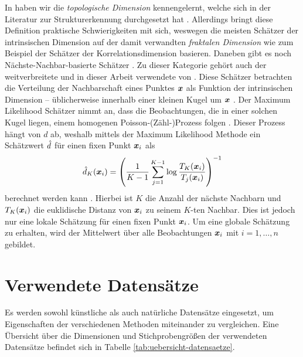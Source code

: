 In  haben wir die \textit{topologische
	Dimension} kennengelernt, welche sich in der Literatur zur Strukturerkennung durchgesetzt hat \parencite[1]{Campadelli.2015}. Allerdings bringt diese Definition praktische Schwierigkeiten mit sich,
weswegen die meisten Schätzer der intrinsischen Dimension auf der damit verwandten
\textit{fraktalen Dimension} wie zum Beispiel der Schätzer der Korrelationsdimension \parencite{Camastra.2002} basieren. Daneben gibt es noch Nächste-Nachbar-basierte Schätzer \parencite[1]{Campadelli.2015}. Zu dieser Kategorie gehört auch der weitverbreitete und in dieser
Arbeit verwendete  von \textcite{Levina.2004}. Diese Schätzer
betrachten die Verteilung der Nachbarschaft eines Punktes $\bm{x}$ als Funktion der
intrinsischen Dimension -- üblicherweise innerhalb einer kleinen Kugel um $\bm{x}$
\parencite[8]{Campadelli.2015}. Der Maximum Likelihood Schätzer nimmt an, dass die Beobachtungen, die
in einer solchen Kugel liegen, einem homogenen Poisson-(Zähl-)Prozess folgen
\parencite[2]{Levina.2004}. Dieser Prozess hängt von $d$ ab, weshalb mittels der Maximum Likelihood
Methode ein Schätzwert $\hat{d}$ für einen fixen Punkt $\bm{x}_i$ als
\begin{equation}
	\hat{d}_K(\bm{x}_i) = \left( \frac{1}{K - 1} \sum_{j=1}^{K - 1} \log \frac{T_K(\bm{x}_i)}{T_j(\bm{x}_i)} \right)^{-1}
\end{equation}
berechnet werden kann \parencite[4]{Levina.2004}. Hierbei ist $K$ die Anzahl der nächste Nachbarn und $T_{K}(\bm{x}_i)$ die
euklidische Distanz von $\bm{x}_i$ zu seinem $K$-ten Nachbar. Dies ist jedoch nur eine lokale
Schätzung für einen fixen Punkt $\bm{x}_i$. Um eine globale Schätzung zu erhalten, wird der
Mittelwert über alle Beobachtungen $\bm{x}_i$ mit $i = 1, \ldots, n$ gebildet.
\section{Verwendete Datensätze}
\label{ch:Vergleich:sec:VerwendeteDatensaetze}
Es werden sowohl künstliche als auch natürliche Datensätze eingesetzt, um Eigenschaften der
verschiedenen Methoden miteinander zu vergleichen. Eine Übersicht über die Dimensionen und Stichprobengrößen der verwendeten Datensätze befindet sich in Tabelle \ref{tab:uebersicht-datensaetze}.


